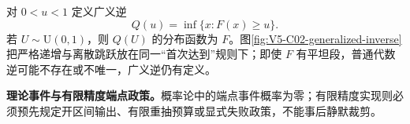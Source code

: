 \documentclass[UTF8,a4paper,11pt,openany]{ctexbook}
\begin{document}
\setcounter{page}{733}
\setcounter{chapter}{31}
\setcounter{figure}{2}
\pagestyle{headings}
对 $0<u<1$ 定义广义逆
\[
  Q(u)=\inf\{x:F(x)\ge u\}.
\]
若 $U\sim\mathrm U(0,1)$，则 $Q(U)$ 的分布函数为 $F$。图\ref{fig:V5-C02-generalized-inverse}把严格递增与离散跳跃放在同一“首次达到”规则下；即使 $F$ 有平坦段，普通代数逆可能不存在或不唯一，广义逆仍有定义。

\begin{comparisonbox}
\textbf{理论事件与有限精度端点政策。}概率论中的端点事件概率为零；有限精度实现则必须预先规定开区间输出、有限重抽预算或显式失败政策，不能事后静默裁剪。
\end{comparisonbox}
\end{document}
